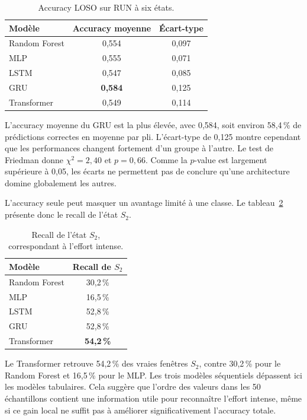 \documentclass[12pt,a4paper]{article}
\begin{document}
\begin{table}[H]
\centering
\caption{Accuracy LOSO sur RUN à six états.}
\label{tab:run_models}
\begin{tabular}{lcc}
\toprule
\textbf{Modèle} & \textbf{Accuracy moyenne} & \textbf{Écart-type} \\
\midrule
Random Forest & 0,554 & 0,097 \\
MLP           & 0,555 & 0,071 \\
LSTM          & 0,547 & 0,085 \\
GRU           & \textbf{0,584} & 0,125 \\
Transformer   & 0,549 & 0,114 \\
\bottomrule
\end{tabular}
\end{table}

L'accuracy moyenne du GRU est la plus élevée, avec 0,584, soit environ
58,4\,\% de prédictions correctes en moyenne par pli. L'écart-type de 0,125
montre cependant que les performances changent fortement d'un groupe à
l'autre. Le test de Friedman donne $\chi^2=2{,}40$ et $p=0{,}66$. Comme la
$p$-value est largement supérieure à 0,05, les écarts ne permettent pas de
conclure qu'une architecture domine globalement les autres.

L'accuracy seule peut masquer un avantage limité à une classe. Le
tableau~\ref{tab:run_s2_recall} présente donc le recall de l'état $S_2$.

\begin{table}[H]
\centering
\caption{Recall de l'état $S_2$, correspondant à l'effort intense.}
\label{tab:run_s2_recall}
\begin{tabular}{lc}
\toprule
\textbf{Modèle} & \textbf{Recall de $S_2$} \\
\midrule
Random Forest & 30,2\,\% \\
MLP           & 16,5\,\% \\
LSTM          & 52,8\,\% \\
GRU           & 52,8\,\% \\
Transformer   & \textbf{54,2\,\%} \\
\bottomrule
\end{tabular}
\end{table}

Le Transformer retrouve 54,2\,\% des vraies fenêtres $S_2$, contre 30,2\,\%
pour le Random Forest et 16,5\,\% pour le MLP. Les trois modèles séquentiels
dépassent ici les modèles tabulaires. Cela suggère que l'ordre des valeurs
dans les 50 échantillons contient une information utile pour reconnaître
l'effort intense, même si ce gain local ne suffit pas à améliorer
significativement l'accuracy totale.
\end{document}
